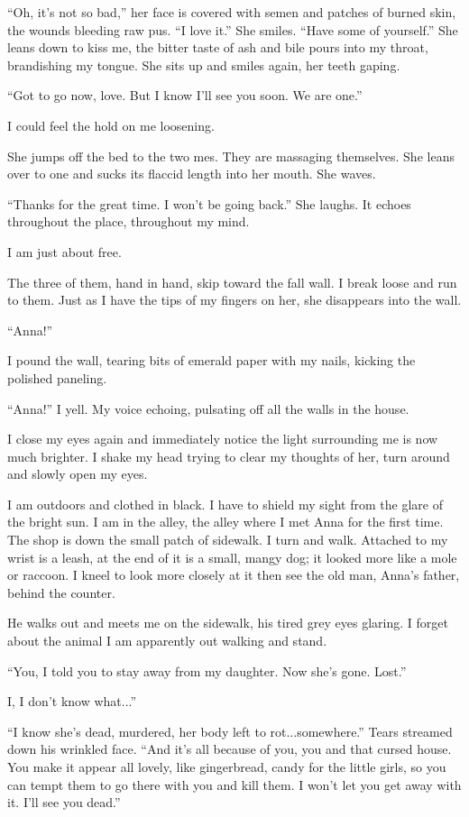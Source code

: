 ``Oh, it's not so bad,'' her face is covered with semen and patches of
burned skin, the wounds bleeding raw pus. ``I love it.'' She smiles.
``Have some of yourself.'' She leans down to kiss me, the bitter taste
of ash and bile pours into my throat, brandishing my tongue. She sits up
and smiles again, her teeth gaping.

``Got to go now, love. But I know I'll see you soon. We are one.''

I could feel the hold on me loosening.

She jumps off the bed to the two mes. They are massaging themselves. She
leans over to one and sucks its flaccid length into her mouth. She
waves.

``Thanks for the great time. I won't be going back.'' She laughs. It
echoes throughout the place, throughout my mind.

I am just about free.

The three of them, hand in hand, skip toward the fall wall. I break
loose and run to them. Just as I have the tips of my fingers on her, she
disappears into the wall.

``Anna!''

I pound the wall, tearing bits of emerald paper with my nails, kicking
the polished paneling.

``Anna!'' I yell. My voice echoing, pulsating off all the walls in the
house.

I close my eyes again and immediately notice the light surrounding me is
now much brighter. I shake my head trying to clear my thoughts of her,
turn around and slowly open my eyes.

I am outdoors and clothed in black. I have to shield my sight from the
glare of the bright sun. I am in the alley, the alley where I met Anna
for the first time. The shop is down the small patch of sidewalk. I turn
and walk. Attached to my wrist is a leash, at the end of it is a small,
mangy dog; it looked more like a mole or raccoon. I kneel to look more
closely at it then see the old man, Anna's father, behind the counter.

He walks out and meets me on the sidewalk, his tired grey eyes glaring.
I forget about the animal I am apparently out walking and stand.

``You, I told you to stay away from my daughter. Now she's gone. Lost.''

I, I don't know what...''

``I know she's dead, murdered, her body left to rot...somewhere.'' Tears
streamed down his wrinkled face. ``And it's all because of you, you and
that cursed house. You make it appear all lovely, like gingerbread,
candy for the little girls, so you can tempt them to go there with you
and kill them. I won't let you get away with it. I'll see you dead.''

